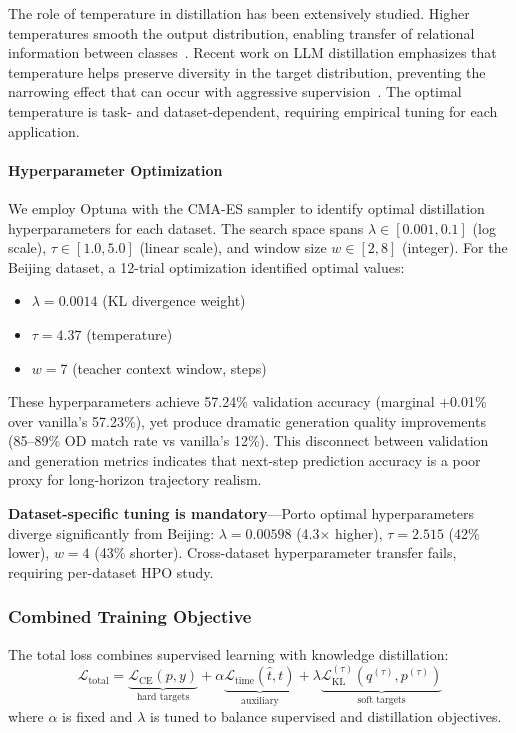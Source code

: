 The role of temperature in distillation has been extensively studied. Higher temperatures smooth the output distribution, enabling transfer of relational information between classes~\cite{hintonDistillingKnowledgeNeural2015}. Recent work on LLM distillation emphasizes that temperature helps preserve diversity in the target distribution, preventing the narrowing effect that can occur with aggressive supervision~\cite{singhORPODistillMixedPolicyPreference2025}. The optimal temperature is task- and dataset-dependent, requiring empirical tuning for each application.

\paragraph{Hyperparameter Optimization}
We employ Optuna with the CMA-ES sampler to identify optimal distillation hyperparameters for each dataset. The search space spans $\lambda \in [0.001, 0.1]$ (log scale), $\tau \in [1.0, 5.0]$ (linear scale), and window size $w \in [2, 8]$ (integer). For the Beijing dataset, a 12-trial optimization identified optimal values:
\begin{itemize}[leftmargin=*,noitemsep]
    \item $\lambda = 0.0014$ (KL divergence weight)
    \item $\tau = 4.37$ (temperature)
    \item $w = 7$ (teacher context window, steps)
\end{itemize}
These hyperparameters achieve 57.24\% validation accuracy (marginal +0.01\% over vanilla's 57.23\%), yet produce dramatic generation quality improvements (85--89\% OD match rate vs vanilla's 12\%). This disconnect between validation and generation metrics indicates that next-step prediction accuracy is a poor proxy for long-horizon trajectory realism.

\textbf{Dataset-specific tuning is mandatory}---Porto optimal hyperparameters diverge significantly from Beijing: $\lambda = 0.00598$ (4.3$\times$ higher), $\tau = 2.515$ (42\% lower), $w = 4$ (43\% shorter). Cross-dataset hyperparameter transfer fails, requiring per-dataset HPO study.

\subsubsection{Combined Training Objective}

The total loss combines supervised learning with knowledge distillation:
\begin{equation}
    \mathcal{L}_{\text{total}} = \underbrace{\mathcal{L}_{\text{CE}}(p, y)}_{\text{hard targets}} +
    \alpha \underbrace{\mathcal{L}_{\text{time}}(\hat{t}, t)}_{\text{auxiliary}} +
    \lambda \underbrace{\mathcal{L}_{\text{KL}}^{(\tau)}(q^{(\tau)}, p^{(\tau)})}_{\text{soft targets}}
    \label{eq:total-loss}
\end{equation}
where $\alpha$ is fixed and $\lambda$ is tuned to balance supervised and distillation objectives.

